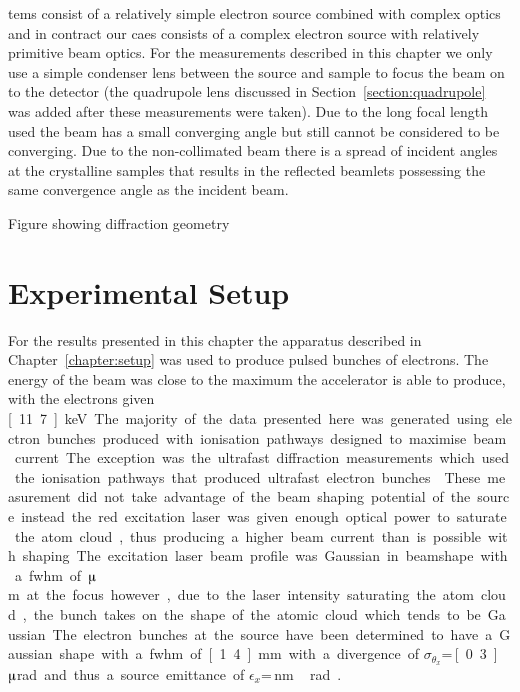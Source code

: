 \Glspl{tem} consist of a relatively simple electron source combined with complex optics and in contract our \gls{caes} consists of a complex electron source with relatively primitive beam optics.
For the measurements described in this chapter we only use a simple condenser lens between the source and sample to focus the beam on to the detector (the quadrupole lens discussed in Section~\ref{section:quadrupole} was added after these measurements were taken).
Due to the long focal length used the beam has a small converging angle but still cannot be considered to be converging.
Due to the non-collimated beam there is a spread of incident angles at the crystalline samples that results in the reflected beamlets possessing the same convergence angle as the incident beam.

{\color{red}Figure showing diffraction geometry}

\section{Experimental Setup}

For the results presented in this chapter the apparatus described in Chapter~\ref{chapter:setup} was used to produce pulsed bunches of electrons.
The energy of the beam was close to the maximum the accelerator is able to produce, with the electrons given \unit[11.7]{keV}.

The majority of the data presented here was generated using electron bunches produced with ionisation pathways designed to maximise beam current.
The exception was the ultrafast diffraction measurements which used the ionisation pathways that produced ultrafast electron bunches~\cite{speirs_single-shot_2015,speirs_identification_2017,speirs_electron_2017}.

These measurement did not take advantage of the beam shaping potential of the source instead the red excitation laser was given enough optical power to saturate the atom cloud, thus producing a higher beam current than is possible with shaping.
The excitation laser beam profile was Gaussian in beamshape with a \gls{fwhm} of \unit[80]{$\muup$m} at the focus however, due to the laser intensity saturating the atom cloud, the bunch takes on the shape of the atomic cloud which tends to be Gaussian.
The electron bunches at the source have been determined to have a Gaussian shape with a \gls{fwhm} of \unit[1.4]{mm} with a divergence of $\sigma_{\theta_x}$=\,\unit[0.3]{$\muup$rad} and thus a source emittance of $\epsilon_x$=\,\unit[50]{nm\,rad}~\cite{mcculloch_high-coherence_2013}.

